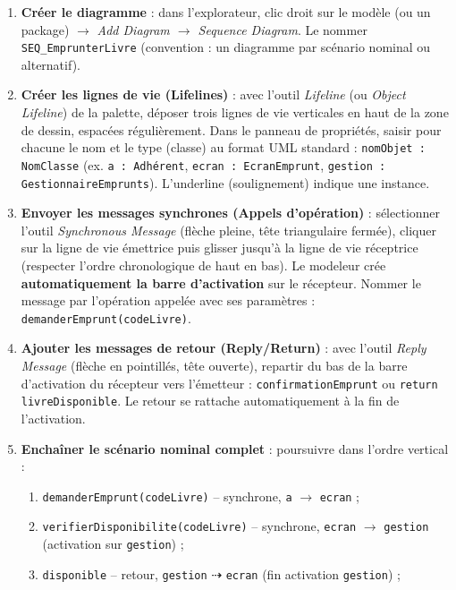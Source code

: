 \documentclass[11pt]{article}
\begin{document}
\begin{methode}
\begin{enumerate}
\item \textbf{Créer le diagramme} : dans l'explorateur, clic droit sur le modèle (ou un package) $\rightarrow$ \emph{Add Diagram $\rightarrow$ Sequence Diagram}. Le nommer \texttt{SEQ\_EmprunterLivre} (convention : un diagramme par scénario nominal ou alternatif).
\item \textbf{Créer les lignes de vie (Lifelines)} : avec l'outil \emph{Lifeline} (ou \emph{Object Lifeline}) de la palette, déposer trois lignes de vie verticales en haut de la zone de dessin, espacées régulièrement. Dans le panneau de propriétés, saisir pour chacune le nom et le type (classe) au format UML standard : \texttt{nomObjet : NomClasse} (ex. \texttt{a : Adhérent}, \texttt{ecran : EcranEmprunt}, \texttt{gestion : GestionnaireEmprunts}). L'underline (soulignement) indique une instance.
\item \textbf{Envoyer les messages synchrones (Appels d'opération)} : sélectionner l'outil \emph{Synchronous Message} (flèche pleine, tête triangulaire fermée), cliquer sur la ligne de vie émettrice puis glisser jusqu'à la ligne de vie réceptrice (respecter l'ordre chronologique de haut en bas). Le modeleur crée \textbf{automatiquement la barre d'activation} sur le récepteur. Nommer le message par l'opération appelée avec ses paramètres : \texttt{demanderEmprunt(codeLivre)}.
\item \textbf{Ajouter les messages de retour (Reply/Return)} : avec l'outil \emph{Reply Message} (flèche en pointillés, tête ouverte), repartir du bas de la barre d'activation du récepteur vers l'émetteur : \texttt{confirmationEmprunt} ou \texttt{return livreDisponible}. Le retour se rattache automatiquement à la fin de l'activation.
\item \textbf{Enchaîner le scénario nominal complet} : poursuivre dans l'ordre vertical :
      \begin{enumerate}
      \item \texttt{demanderEmprunt(codeLivre)} -- synchrone, \texttt{a} $\rightarrow$ \texttt{ecran} ;
      \item \texttt{verifierDisponibilite(codeLivre)} -- synchrone, \texttt{ecran} $\rightarrow$ \texttt{gestion} (activation sur \texttt{gestion}) ;
      \item \texttt{disponible} -- retour, \texttt{gestion} $\dashrightarrow$ \texttt{ecran} (fin activation \texttt{gestion}) ;

\end{enumerate}
\end{enumerate}
\end{methode}
\end{document}
